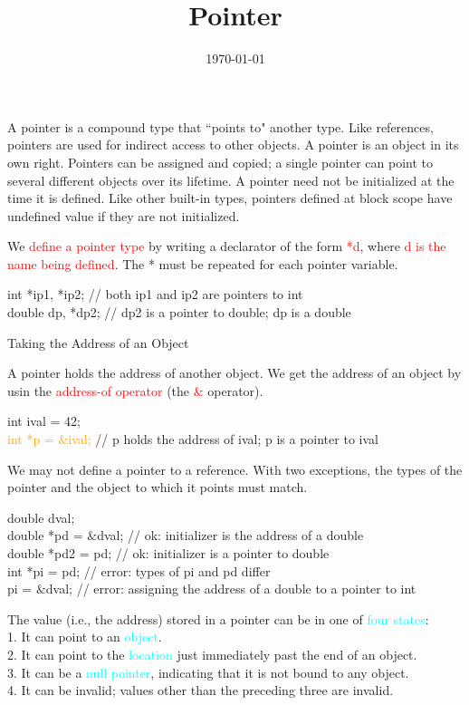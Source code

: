 \documentclass[12pt,a4paper]{article}
\title{Pointer}
\author{}
\date{\today}
\begin{document}
\maketitle

A pointer is a compound type that ``points to" another type. Like references, pointers are used for indirect access to other objects. A pointer is an object in its own right. Pointers can be assigned and copied; a single pointer can point to several different objects over its lifetime. A pointer need not be initialized at the time it is defined. Like other built-in types, pointers defined at block scope have undefined value if they are not initialized.

We \textcolor{red}{define a pointer type} by writing a declarator of the form \textcolor{red}{*d}, where \textcolor{red}{d is the name being defined}. The * must be repeated for each pointer variable.

int *ip1, *ip2; // both ip1 and ip2 are pointers to int \\
double dp, *dp2; // dp2 is a pointer to double; dp is a double

Taking the Address of an Object

A pointer holds the address of another object. We get the address of an object by usin the \textcolor{red}{address-of operator} (the \textcolor{red}{$\&$} operator).

int ival = 42; \\
\textcolor{orange}{int *p = $\&$ival;} // p holds the address of ival; p is a pointer to ival

We may not define a pointer to a reference. With two exceptions, the types of the pointer and the object to which it points must match.

double dval; \\
double *pd = $\&$dval; // ok: initializer is the address of a double \\
double *pd2 = pd; // ok: initializer is a pointer to double \\
int *pi = pd; // error: types of pi and pd differ \\
pi = $\&$dval; // error: assigning the address of a double to a pointer to int

The value (i.e., the address) stored in a pointer can be in one of \textcolor{cyan}{four states}: \\
1. It can point to an \textcolor{cyan}{object}. \\
2. It can point to the \textcolor{cyan}{location} just immediately past the end of an object. \\
3. It can be a \textcolor{cyan}{null pointer}, indicating that it is not bound to any object. \\
4. It can be invalid; values other than the preceding three are invalid.
\end{document}
